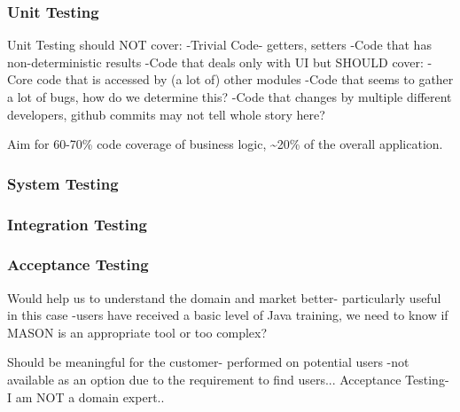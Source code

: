 \documentclass[11pt]{article}
\begin{document}

\subsubsection{Unit Testing}
Unit Testing should NOT cover:
-Trivial Code- getters, setters
-Code that has non-deterministic results
-Code that deals only with UI
but SHOULD cover:
-Core code that is accessed by (a lot of) other modules
-Code that seems to gather a lot of bugs, how do we determine this?
-Code that changes by multiple different developers, github commits may not tell whole story here?
\cite{dont_test_blindly}

Aim for 60-70\% code coverage of business logic,
\textasciitilde 20\% of the overall application.


\subsubsection{System Testing}


\subsubsection{Integration Testing}



\subsubsection{Acceptance Testing}
Would help us to understand the domain and market better-
particularly useful in this case
	-users have received a basic level of Java training, we need to know if MASON is an appropriate tool or too complex?

Should be meaningful for the customer- performed on potential users
-not available as an option due to the requirement to find users...
Acceptance Testing- I am NOT a domain expert..
\end{document}
